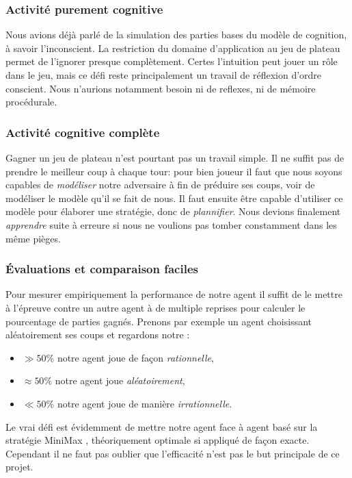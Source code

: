 \subsubsection{Activité purement cognitive}
Nous avions déjà parlé de la simulation des parties bases du modèle de cognition, à savoir l'inconscient. La restriction du domaine d'application au jeu de plateau permet de l'ignorer presque complètement. Certes l'intuition peut jouer un rôle dans le jeu, mais ce défi reste principalement un travail de réflexion d'ordre conscient. Nous n'aurions notamment besoin ni de reflexes, ni de mémoire procédurale.

\subsubsection{Activité cognitive complète}
Gagner un jeu de plateau n'est pourtant pas un travail simple. Il ne suffit pas de prendre le \og meilleur \fg{} coup à chaque tour: pour bien joueur il faut que nous soyons capables de \emph{modéliser} notre adversaire à fin de préduire ses coups, voir de modéliser le modèle qu'il se fait de nous. Il faut ensuite être capable d'utiliser ce modèle pour élaborer une stratégie, donc de \emph{plannifier}. Nous devions finalement \emph{apprendre} suite à erreure si nous ne voulions pas tomber constamment dans les même pièges. 

\subsubsection{Évaluations et comparaison faciles}
Pour mesurer empiriquement la performance de notre agent il suffit de le mettre à l'épreuve contre un autre agent à de multiple reprises pour calculer le pourcentage de parties gagnés. Prenons par exemple un agent choisissant aléatoirement ses coups et regardons notre :

\begin{itemize}
\item $\gg 50 \% $ notre agent joue de façon \emph{rationnelle}, 
\item $\approx 50 \% $ notre agent joue \emph{aléatoirement},
\item $\ll 50 \% $ notre agent joue de manière \emph{irrationnelle}.
\end{itemize}

Le vrai défi est évidemment de mettre notre agent face à agent basé sur la stratégie \og MiniMax \fg{}, théoriquement optimale si appliqué de façon exacte. Cependant il ne faut pas oublier que l'efficacité n'est pas le but principale de ce projet.

